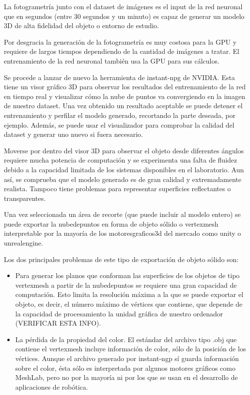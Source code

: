 \documentclass[a4paper, 12pt, spanish, twoside]{article}
\begin{document}
La fotogrametría junto con el dataset de imágenes es el input de la red neuronal que en segundos (entre 30 segundos y un minuto) es capaz de generar un modelo 3D de alta fidelidad del objeto o entorno de estudio. 


Por desgracia la generación de la fotogrametría es muy costosa para la GPU y requiere de largos tiempos dependiendo de la cantidad de imágenes a tratar. El entrenamiento de la red neuronal también usa la GPU para sus cálculos.

Se procede a lanzar de nuevo la herramienta de instant-npg de NVIDIA. Esta tiene un visor gráfico 3D para observar los resultados del entrenamiento de la red en tiempo real y visualizar cómo la nube de puntos va convergiendo en la imagen de nuestro dataset. Una vez obtenido un resultado aceptable se puede detener el entrenamiento y perfilar el modelo generado, recortando la parte deseada, por ejemplo. Además, se puede usar el visualizador para comprobar la calidad del dataset y generar uno nuevo si fuera necesario.

Moverse por dentro del visor 3D para observar el objeto desde diferentes ángulos requiere mucha potencia de computación y se experimenta una falta de fluidez debido a la capacidad limitada de los sistemas disponibles en el laboratorio. Aun así, se comprueba que el modelo generado es de gran calidad y extremadamente realista. Tampoco tiene problemas para representar superficies reflectantes o transparentes.


Una vez seleccionada un área de recorte (que puede incluir al modelo entero) se puede exportar la \gls{nubedepuntos} en forma de objeto sólido o \gls{vertexmesh} interpretable por la mayoría de los \gls{motoresgraficos3d} del mercado como \gls{unity} o \gls{unrealengine}. 

Los dos principales problemas de este tipo de exportación de objeto sólido son: 

\begin{itemize} 
\item Para generar los planos que conforman las superficies de los objetos de tipo \gls{vertexmesh} a partir de la \gls{nubedepuntos}  se requiere una gran capacidad de computación. Esto limita la resolución máxima a la que se puede exportar el objeto, es decir, el número máximo de vértices que contiene, que depende de la capacidad de procesamiento la unidad gráfica de nuestro ordenador (VERIFICAR ESTA INFO). 

\item La pérdida de la propiedad del color. El estándar del archivo tipo .obj que contiene el \gls{vertexmesh} incluye información de color, sólo de la posición de los vértices. Aunque el archivo generado por instant-ngp sí guarda información sobre el color, ésta sólo es interpretada por algunos motores gráficos como MeshLab, pero no por la mayoría ni por los que se usan en el desarrollo de aplicaciones de robótica. 
\end{itemize} 
\end{document}
